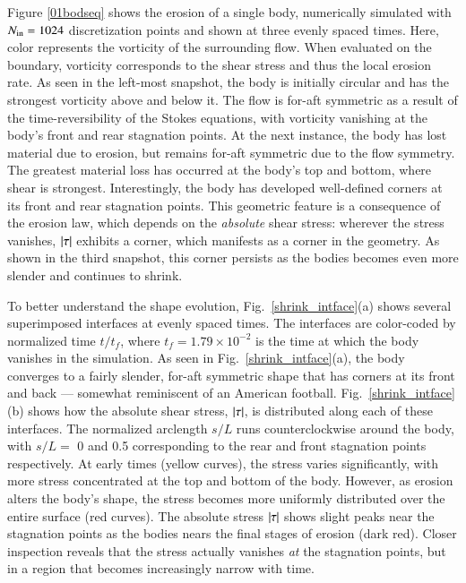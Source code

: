 \documentclass[preprint, 10pt]{elsarticle}
\begin{document}
Figure \ref{01bodseq} shows the erosion of a single body, numerically simulated with $N_{\mathrm{in}} = 1024$ discretization points and shown at three evenly spaced times. Here, color represents the vorticity of the surrounding flow. When evaluated on the boundary, vorticity corresponds to the shear stress and thus the local erosion rate. As seen in the left-most snapshot, the body is initially circular and has the strongest vorticity above and below it. The flow is for-aft symmetric as a result of the time-reversibility of the Stokes equations, with vorticity vanishing at the body's front and rear stagnation points. 
At the next instance, the body has lost material due to erosion, but remains for-aft symmetric due to the flow symmetry. The greatest material loss has occurred at the body's top and bottom, where shear is strongest. Interestingly, the body has developed well-defined corners at its front and rear stagnation points. This geometric feature is a consequence of the erosion law, which depends on the {\em absolute} shear stress: wherever the stress vanishes, $\lvert \tau \rvert$ exhibits a corner, which manifests as a corner in the geometry. As shown in the third snapshot, this corner persists as the bodies becomes even more slender and continues to shrink.

To better understand the shape evolution, Fig.~\ref{shrink_intface}(a) shows several superimposed interfaces at evenly spaced times. The interfaces are color-coded by normalized time $t/t_f$, where $t_f = 1.79 \times 10^{-2}$ is the time at which the body vanishes in the simulation. As seen in Fig.~\ref{shrink_intface}(a), the body converges to a fairly slender, for-aft symmetric shape that has corners at its front and back --- somewhat reminiscent of an American football.
Fig.~\ref{shrink_intface}(b) shows how the absolute shear stress, $\lvert \tau \rvert$, is distributed along each of these interfaces. The normalized arclength $s/L$ runs counterclockwise around the body, with $s/L = $ 0 and 0.5 corresponding to the rear and front stagnation points respectively. At early times (yellow curves), the stress varies significantly, with more stress concentrated at the top and bottom of the body. However, as erosion alters the body's shape, the stress becomes more uniformly distributed over the entire surface (red curves). The absolute stress $\lvert \tau \rvert$ shows slight peaks near the stagnation points as the bodies nears the final stages of erosion (dark red). Closer inspection reveals that the stress actually vanishes {\em at} the stagnation points, but in a region that becomes increasingly narrow with time.
\end{document}
